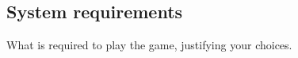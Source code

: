 \subsection{System requirements}
What is required to play the game, justifying your choices.

\clearpage